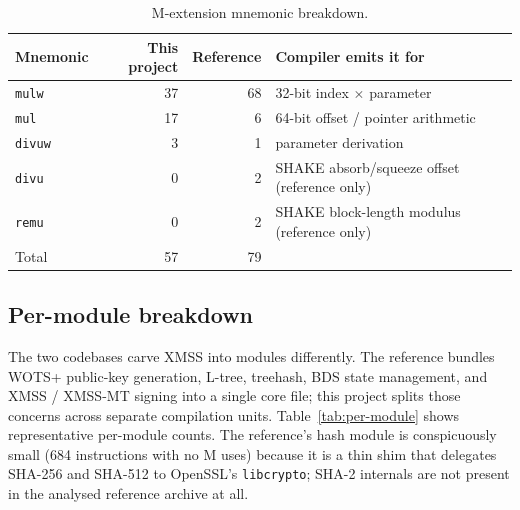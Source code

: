 \documentclass[11pt,a4paper]{article}
\begin{document}
\begin{table}[ht]
\centering
\caption{M-extension mnemonic breakdown.}
\label{tab:m-mix}
\begin{tabular}{@{}lrrl@{}}
\toprule
Mnemonic        & This project & Reference & Compiler emits it for \\
\midrule
\texttt{mulw}   & 37 & 68 & 32-bit index $\times$ parameter \\
\texttt{mul}    & 17 &  6 & 64-bit offset / pointer arithmetic \\
\texttt{divuw}  &  3 &  1 & parameter derivation \\
\texttt{divu}   &  0 &  2 & SHAKE absorb/squeeze offset (reference only) \\
\texttt{remu}   &  0 &  2 & SHAKE block-length modulus (reference only) \\
\midrule
Total           & 57 & 79 & \\
\bottomrule
\end{tabular}
\end{table}

\subsection{Per-module breakdown}

The two codebases carve XMSS into modules differently. The reference
bundles WOTS+ public-key generation, L-tree, treehash, BDS state
management, and XMSS / XMSS-MT signing into a single core file; this
project splits those concerns across separate compilation units.
Table~\ref{tab:per-module} shows representative per-module counts.
The reference's hash module is conspicuously small (684 instructions
with no M uses) because it is a thin shim that delegates SHA-256 and
SHA-512 to OpenSSL's \texttt{libcrypto}; SHA-2 internals are not
present in the analysed reference archive at all.
\end{document}
